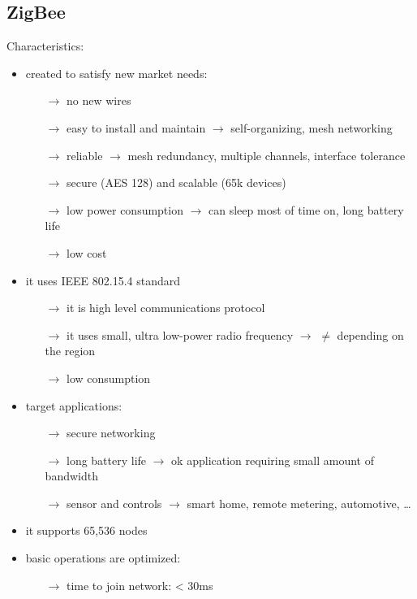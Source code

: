 \subsection{ZigBee}
Characteristics:
\begin{itemize}
    \item created to satisfy new market needs:
    \begin{itemize}
        \item[$\rightarrow$] no new wires
        \item[$\rightarrow$] easy to install and maintain $\rightarrow$ self-organizing, mesh networking
        \item[$\rightarrow$] reliable $\rightarrow$ mesh redundancy, multiple channels, interface tolerance
        \item[$\rightarrow$] secure (AES 128) and scalable (65k devices)
        \item[$\rightarrow$] low power consumption $\rightarrow$ can sleep most of time on, long battery life
        \item[$\rightarrow$] low cost 
    \end{itemize}
    \item it uses IEEE 802.15.4 standard
    \begin{itemize}
        \item[$\rightarrow$] it is high level communications protocol
        \item[$\rightarrow$] it uses small, ultra low-power radio frequency $\rightarrow$ $\neq$ depending on the region
        \item[$\rightarrow$] low consumption 
    \end{itemize}
    \item target applications:
    \begin{itemize}
        \item[$\rightarrow$] secure networking
        \item[$\rightarrow$] long battery life $\rightarrow$ ok application requiring small amount of bandwidth
        \item[$\rightarrow$] sensor and controls $\rightarrow$ smart home, remote metering, automotive, \dots
    \end{itemize}
    \item it supports 65,536 nodes
    \item basic operations are optimized:
    \begin{itemize}
        \item[$\rightarrow$] time to join network: < 30ms

\end{itemize}
\end{itemize}
